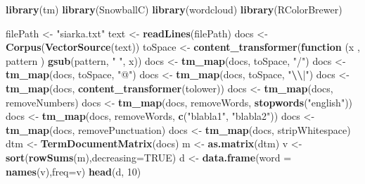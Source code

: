 \documentclass[
  12pt,
]{article}
\newenvironment{Shaded}{\begin{snugshade}}{\end{snugshade}}
\newcommand{\AttributeTok}[1]{\textcolor[rgb]{0.13,0.29,0.53}{#1}}
\newcommand{\ConstantTok}[1]{\textcolor[rgb]{0.56,0.35,0.01}{#1}}
\newcommand{\ControlFlowTok}[1]{\textcolor[rgb]{0.13,0.29,0.53}{\textbf{#1}}}
\newcommand{\DecValTok}[1]{\textcolor[rgb]{0.00,0.00,0.81}{#1}}
\newcommand{\FunctionTok}[1]{\textcolor[rgb]{0.13,0.29,0.53}{\textbf{#1}}}
\newcommand{\NormalTok}[1]{#1}
\newcommand{\OtherTok}[1]{\textcolor[rgb]{0.56,0.35,0.01}{#1}}
\newcommand{\SpecialCharTok}[1]{\textcolor[rgb]{0.81,0.36,0.00}{\textbf{#1}}}
\newcommand{\StringTok}[1]{\textcolor[rgb]{0.31,0.60,0.02}{#1}}
\begin{document}
\begin{Shaded}
\begin{Highlighting}[]
\FunctionTok{library}\NormalTok{(tm)}
\FunctionTok{library}\NormalTok{(SnowballC)}
\FunctionTok{library}\NormalTok{(wordcloud)}
\FunctionTok{library}\NormalTok{(RColorBrewer)}

\NormalTok{filePath }\OtherTok{\textless{}{-}} \StringTok{"siarka.txt"}
\NormalTok{text }\OtherTok{\textless{}{-}} \FunctionTok{readLines}\NormalTok{(filePath)}
\NormalTok{docs }\OtherTok{\textless{}{-}} \FunctionTok{Corpus}\NormalTok{(}\FunctionTok{VectorSource}\NormalTok{(text))}
\NormalTok{toSpace }\OtherTok{\textless{}{-}} \FunctionTok{content\_transformer}\NormalTok{(}\ControlFlowTok{function}\NormalTok{ (x , pattern ) }\FunctionTok{gsub}\NormalTok{(pattern, }\StringTok{" "}\NormalTok{, x))}
\NormalTok{docs }\OtherTok{\textless{}{-}} \FunctionTok{tm\_map}\NormalTok{(docs, toSpace, }\StringTok{"/"}\NormalTok{)}
\NormalTok{docs }\OtherTok{\textless{}{-}} \FunctionTok{tm\_map}\NormalTok{(docs, toSpace, }\StringTok{"@"}\NormalTok{)}
\NormalTok{docs }\OtherTok{\textless{}{-}} \FunctionTok{tm\_map}\NormalTok{(docs, toSpace, }\StringTok{"}\SpecialCharTok{\textbackslash{}\textbackslash{}}\StringTok{|"}\NormalTok{)}
\NormalTok{docs }\OtherTok{\textless{}{-}} \FunctionTok{tm\_map}\NormalTok{(docs, }\FunctionTok{content\_transformer}\NormalTok{(tolower))}
\NormalTok{docs }\OtherTok{\textless{}{-}} \FunctionTok{tm\_map}\NormalTok{(docs, removeNumbers)}
\NormalTok{docs }\OtherTok{\textless{}{-}} \FunctionTok{tm\_map}\NormalTok{(docs, removeWords, }\FunctionTok{stopwords}\NormalTok{(}\StringTok{"english"}\NormalTok{))}
\NormalTok{docs }\OtherTok{\textless{}{-}} \FunctionTok{tm\_map}\NormalTok{(docs, removeWords, }\FunctionTok{c}\NormalTok{(}\StringTok{"blabla1"}\NormalTok{, }\StringTok{"blabla2"}\NormalTok{)) }
\NormalTok{docs }\OtherTok{\textless{}{-}} \FunctionTok{tm\_map}\NormalTok{(docs, removePunctuation)}
\NormalTok{docs }\OtherTok{\textless{}{-}} \FunctionTok{tm\_map}\NormalTok{(docs, stripWhitespace)}
\NormalTok{dtm }\OtherTok{\textless{}{-}} \FunctionTok{TermDocumentMatrix}\NormalTok{(docs)}
\NormalTok{m }\OtherTok{\textless{}{-}} \FunctionTok{as.matrix}\NormalTok{(dtm)}
\NormalTok{v }\OtherTok{\textless{}{-}} \FunctionTok{sort}\NormalTok{(}\FunctionTok{rowSums}\NormalTok{(m),}\AttributeTok{decreasing=}\ConstantTok{TRUE}\NormalTok{)}
\NormalTok{d }\OtherTok{\textless{}{-}} \FunctionTok{data.frame}\NormalTok{(}\AttributeTok{word =} \FunctionTok{names}\NormalTok{(v),}\AttributeTok{freq=}\NormalTok{v)}
\FunctionTok{head}\NormalTok{(d, }\DecValTok{10}\NormalTok{)}
\end{Highlighting}
\end{Shaded}
\end{document}
